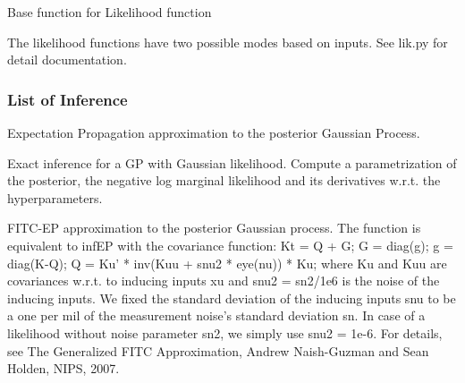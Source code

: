 \documentclass[letterpaper,10pt,english]{sphinxmanual}
\begin{document}
\begin{fulllineitems}
\label{Likelihoods:pyGPs.Core.lik.Likelihood}
Base function for Likelihood function

\begin{fulllineitems}
\label{Likelihoods:pyGPs.Core.lik.Likelihood.proceed}
The likelihood functions have two possible modes based on inputs. 
See lik.py for detail documentation.

\end{fulllineitems}


\end{fulllineitems}



\subsubsection{List of Inference}
\label{Likelihoods:module-pyGPs.Core.inf}\label{Likelihoods:list-of-inference}

\begin{fulllineitems}
\label{Likelihoods:pyGPs.Core.inf.EP}
Expectation Propagation approximation to the posterior Gaussian Process.

\end{fulllineitems}


\begin{fulllineitems}
\label{Likelihoods:pyGPs.Core.inf.Exact}
Exact inference for a GP with Gaussian likelihood. Compute a parametrization
of the posterior, the negative log marginal likelihood and its derivatives
w.r.t. the hyperparameters.

\end{fulllineitems}


\begin{fulllineitems}
\label{Likelihoods:pyGPs.Core.inf.FITC_EP}
FITC-EP approximation to the posterior Gaussian process. The function is
equivalent to infEP with the covariance function:
Kt = Q + G; G = diag(g); g = diag(K-Q);  Q = Ku' * inv(Kuu + snu2 * eye(nu)) * Ku;
where Ku and Kuu are covariances w.r.t. to inducing inputs xu and
snu2 = sn2/1e6 is the noise of the inducing inputs. We fixed the standard
deviation of the inducing inputs snu to be a one per mil of the measurement 
noise's standard deviation sn. In case of a likelihood without noise
parameter sn2, we simply use snu2 = 1e-6.
For details, see The Generalized FITC Approximation, Andrew Naish-Guzman and
Sean Holden, NIPS, 2007.

\end{fulllineitems}
\end{document}
